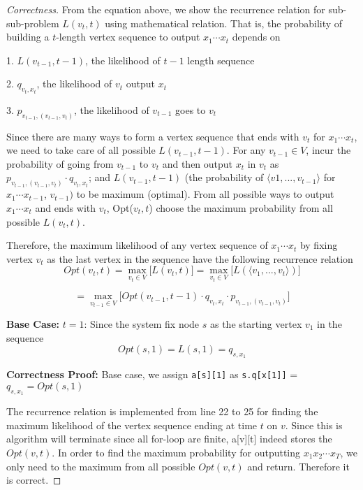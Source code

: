 \documentclass[openany]{article}
\begin{document}
\begin{proof}[Correctness]{}
From the equation above, we show the recurrence relation for sub-sub-problem $L(v_t,t)$ using mathematical relation. That is, the probability of building a $t$-length vertex sequence to output $x_1\cdots x_t$ depends on

1. $L(v_{t-1},t-1)$, the likelihood of $t-1$ length sequence

2. $q_{v_t, x_t}$, the likelihood of $v_t$ output $x_t$

3. $p_{v_{t-1}, (v_{t-1}, v_t)}$, the likelihood of $v_{t-1}$ goes to $v_t$


Since there are many ways to form a vertex sequence that ends with $v_t$ for $x_1\cdots x_t$, we need to take care of all possible $L(v_{t-1},t-1)$. For any $v_{t-1} \in V$, incur the probability of going from $v_{t-1}$ to $v_t$ and then output $x_t$ in $v_t$ as $p_{v_{t-1}, (v_{t-1},v_t)} \cdot q_{v_t,x_t}$; and $L(v_{t-1},t-1)$ (the probability of $\langle v1,...,v_{t-1} \rangle$ for $x_1\cdots x_{t-1}$, $v_{t-1})$ to be maximum (optimal). From all possible ways to output $x_1\cdots x_t$ and ends with $v_t$, Opt($v_t,t$) choose the maximum probability from all possible $L(v_t, t)$.

Therefore, the maximum likelihood of any vertex sequence of $x_1\cdots x_t$ by fixing vertex $v_t$ as the last vertex in the sequence have the following recurrence relation
\[Opt(v_t,t) = \mathop{\max}_{v_t\in V} \Bigg[ L(v_t,t) \Bigg]
= \mathop{\max}_{v_t\in V} \Bigg[ L(\langle v_1,...,v_{t} \rangle) \Bigg]  \]

\[= \mathop{\max}_{v_{t-1}\in V} \Bigg[ Opt(v_{t-1},t-1) \cdot q_{v_t,x_t} \cdot p_{v_{t-1},(v_{t-1},v_t)} \Bigg]\]




\textbf{Base Case:}
$t = 1$: Since the system fix node $s$ as the starting vertex $v_1$ in the sequence
\[Opt(s,1) = L(s,1) = q_{s,x_1}\]
    
\textbf{Correctness Proof:}
Base case, we assign \texttt{a[s][1]} as \texttt{s.q[x[1]]} = $q_{s,x_1} = Opt(s,1)$

The recurrence relation is implemented from line 22 to 25 for finding the maximum likelihood of the vertex sequence ending at time $t$ on $v$. Since this is algorithm will terminate since all for-loop are finite, a[v][t] indeed stores the $Opt(v,t)$. In order to find the maximum probability for outputting $x_1x_2\cdots x_T$, we only need to the maximum from all possible $Opt(v,t)$ and return. Therefore it is correct.
\end{proof}
\end{document}
